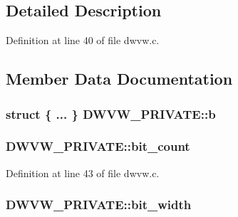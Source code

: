 \begin{DoxyCompactItemize}
\begin{tabbing}
\end{tabbing}\end{DoxyCompactItemize}


\subsection{Detailed Description}


Definition at line 40 of file dwvw.\+c.



\subsection{Member Data Documentation}
\subsubsection[{\texorpdfstring{b}{b}}]{\setlength{\rightskip}{0pt plus 5cm}struct \{ ... \}   D\+W\+V\+W\+\_\+\+P\+R\+I\+V\+A\+T\+E\+::b}\hypertarget{struct_d_w_v_w___p_r_i_v_a_t_e_aadf9e9830f9db1a95c9239b09bcffe5c}{}\label{struct_d_w_v_w___p_r_i_v_a_t_e_aadf9e9830f9db1a95c9239b09bcffe5c}
\subsubsection[{\texorpdfstring{bit\+\_\+count}{bit_count}}]{ D\+W\+V\+W\+\_\+\+P\+R\+I\+V\+A\+T\+E\+::bit\+\_\+count}\hypertarget{struct_d_w_v_w___p_r_i_v_a_t_e_ac7e60a83a1f336bd6619bebc278b6f39}{}\label{struct_d_w_v_w___p_r_i_v_a_t_e_ac7e60a83a1f336bd6619bebc278b6f39}


Definition at line 43 of file dwvw.\+c.

\subsubsection[{\texorpdfstring{bit\+\_\+width}{bit_width}}]{ D\+W\+V\+W\+\_\+\+P\+R\+I\+V\+A\+T\+E\+::bit\+\_\+width}\hypertarget{struct_d_w_v_w___p_r_i_v_a_t_e_a52a90f5ed503dfa5661ce3901f85428e}{}\label{struct_d_w_v_w___p_r_i_v_a_t_e_a52a90f5ed503dfa5661ce3901f85428e}


